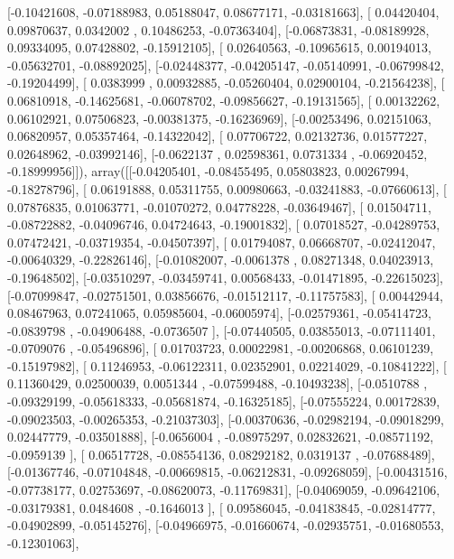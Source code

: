 \documentclass{article}
\begin{document}
       [-0.10421608, -0.07188983,  0.05188047,  0.08677171, -0.03181663],
       [ 0.04420404,  0.09870637,  0.0342002 ,  0.10486253, -0.07363404],
       [-0.06873831, -0.08189928,  0.09334095,  0.07428802, -0.15912105],
       [ 0.02640563, -0.10965615,  0.00194013, -0.05632701, -0.08892025],
       [-0.02448377, -0.04205147, -0.05140991, -0.06799842, -0.19204499],
       [ 0.0383999 ,  0.00932885, -0.05260404,  0.02900104, -0.21564238],
       [ 0.06810918, -0.14625681, -0.06078702, -0.09856627, -0.19131565],
       [ 0.00132262,  0.06102921,  0.07506823, -0.00381375, -0.16236969],
       [-0.00253496,  0.02151063,  0.06820957,  0.05357464, -0.14322042],
       [ 0.07706722,  0.02132736,  0.01577227,  0.02648962, -0.03992146],
       [-0.0622137 ,  0.02598361,  0.0731334 , -0.06920452, -0.18999956]]), array([[-0.04205401, -0.08455495,  0.05803823,  0.00267994, -0.18278796],
       [ 0.06191888,  0.05311755,  0.00980663, -0.03241883, -0.07660613],
       [ 0.07876835,  0.01063771, -0.01070272,  0.04778228, -0.03649467],
       [ 0.01504711, -0.08722882, -0.04096746,  0.04724643, -0.19001832],
       [ 0.07018527, -0.04289753,  0.07472421, -0.03719354, -0.04507397],
       [ 0.01794087,  0.06668707, -0.02412047, -0.00640329, -0.22826146],
       [-0.01082007, -0.0061378 ,  0.08271348,  0.04023913, -0.19648502],
       [-0.03510297, -0.03459741,  0.00568433, -0.01471895, -0.22615023],
       [-0.07099847, -0.02751501,  0.03856676, -0.01512117, -0.11757583],
       [ 0.00442944,  0.08467963,  0.07241065,  0.05985604, -0.06005974],
       [-0.02579361, -0.05414723, -0.0839798 , -0.04906488, -0.0736507 ],
       [-0.07440505,  0.03855013, -0.07111401, -0.0709076 , -0.05496896],
       [ 0.01703723,  0.00022981, -0.00206868,  0.06101239, -0.15197982],
       [ 0.11246953, -0.06122311,  0.02352901,  0.02214029, -0.10841222],
       [ 0.11360429,  0.02500039,  0.0051344 , -0.07599488, -0.10493238],
       [-0.0510788 , -0.09329199, -0.05618333, -0.05681874, -0.16325185],
       [-0.07555224,  0.00172839, -0.09023503, -0.00265353, -0.21037303],
       [-0.00370636, -0.02982194, -0.09018299,  0.02447779, -0.03501888],
       [-0.0656004 , -0.08975297,  0.02832621, -0.08571192, -0.0959139 ],
       [ 0.06517728, -0.08554136,  0.08292182,  0.0319137 , -0.07688489],
       [-0.01367746, -0.07104848, -0.00669815, -0.06212831, -0.09268059],
       [-0.00431516, -0.07738177,  0.02753697, -0.08620073, -0.11769831],
       [-0.04069059, -0.09642106, -0.03179381,  0.0484608 , -0.1646013 ],
       [ 0.09586045, -0.04183845, -0.02814777, -0.04902899, -0.05145276],
       [-0.04966975, -0.01660674, -0.02935751, -0.01680553, -0.12301063],
\end{document}
